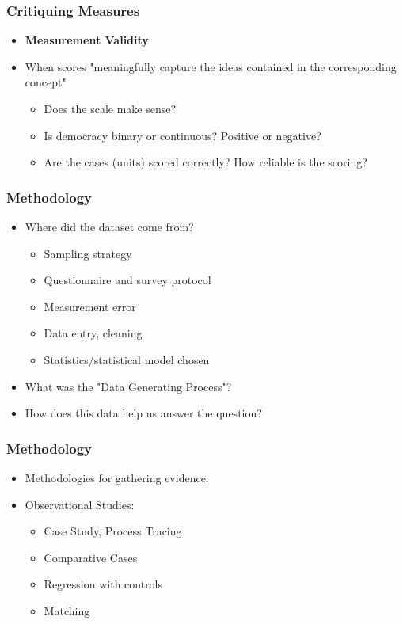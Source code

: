 \documentclass[xcolor=x11names,compress]{beamer}\usepackage[]{graphicx}\usepackage[]{color}
\renewcommand{\(}{\begin{columns}}
\renewcommand{\)}{\end{columns}}
\newcommand{\<}[1]{\begin{column}{#1}}
\renewcommand{\>}{\end{column}}
\begin{document}
\begin{frame}
\frametitle{Critiquing Measures}
\begin{itemize}
\item \textbf{Measurement Validity}
\pause
\item When scores "meaningfully capture the ideas contained in the corresponding concept"
\pause
\begin{itemize}
\item Does the scale make sense? 
\pause
\item Is democracy binary or continuous? Positive or negative?
\pause
\item Are the cases (units) scored correctly? How reliable is the scoring?
\end{itemize}
\end{itemize}
\end{frame}




\begin{frame}
\frametitle{Methodology}
\begin{itemize}
\item Where did the dataset come from?
\pause
\begin{itemize}
\item Sampling strategy
\pause
\item Questionnaire and survey protocol
\pause
\item Measurement error
\pause
\item Data entry, cleaning
\pause
\item Statistics/statistical model chosen
\pause
\end{itemize}
\item What was the "Data Generating Process"?
\item How does this data help us answer the question?
\end{itemize}
\end{frame}

\begin{frame}
\frametitle{Methodology}
\begin{itemize}
\item Methodologies for gathering evidence:
\pause
\item Observational Studies:
\begin{itemize}
\item Case Study, Process Tracing
\pause
\item Comparative Cases
\pause
\item Regression with controls
\pause
\item Matching
\end{itemize}
\end{itemize}
\end{frame}
\end{document}
